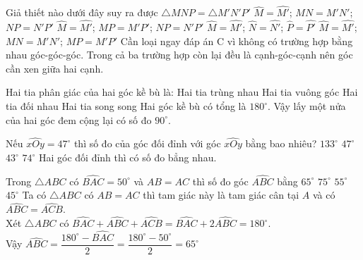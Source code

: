 			\begin{ex}%
				Giả thiết nào dưới đây suy ra được $\triangle MNP=\triangle M'N'P'$
				\choice
				{$\widehat{M}=\widehat{M'}$; $MN=M'N'$; $NP=N'P'$}
				{$\widehat{M}=\widehat{M'}$; $MP=M'P'$; $NP=N'P'$}
				{$\widehat{M}=\widehat{M'}$; $\widehat{N}=\widehat{N'}$; $\widehat{P}=\widehat{P'}$}
				{\True $\widehat{M}=\widehat{M'}$; $MN=M'N'$; $MP=M'P'$}
				\loigiai
				{
					Cần loại ngay đáp án C vì không có trường hợp bằng nhau góc-góc-góc. Trong cả ba trường hợp còn lại đều là cạnh-góc-cạnh nên góc cần xen giữa hai cạnh.
				}
			\end{ex}
			\begin{ex}%
				Hai tia phân giác của hai góc kề bù là:
				\choice
				{Hai tia trùng nhau}
				{\True Hai tia vuông góc}
				{Hai tia đối nhau}
				{Hai tia song song}
				\loigiai
				{
					Hai góc kề bù có tổng là $180^\circ$. Vậy lấy một nửa của hai góc đem cộng lại có số đo $90^\circ$.
				}
			\end{ex}
			\begin{ex}%
				Nếu $\widehat{xOy}=47^\circ$ thì số đo của góc đối đỉnh với góc $\widehat{xOy}$ bằng bao nhiêu?
				\choice
				{$133^\circ$}
				{\True $47^\circ$}
				{$43^\circ$}
				{$74^\circ$}
				\loigiai
				{
					Hai góc đối đỉnh thì có số đo bẳng nhau.
				}
			\end{ex}
			\begin{ex}%
				Trong $\triangle ABC$ có $\widehat{BAC}=50^\circ$ và $AB=AC$ thì số đo góc $\widehat{ABC}$ bằng
				\choice
				{\True $65^\circ$}
				{$75^\circ$}
				{$55^\circ$}
				{$45^\circ$}
				\loigiai
				{
					Ta có $\triangle ABC$ có $AB=AC$ thì tam giác này là tam giác cân tại $A$ và có $\widehat{ABC}=\widehat{ACB}$.\\
					Xét $\triangle ABC$ có $\widehat{BAC}+\widehat{ABC}+\widehat{ACB}=\widehat{BAC}+2\widehat{ABC}=180^\circ$.\\
					Vậy $\widehat{ABC}=\dfrac{180^\circ-\widehat{BAC}}{2}=\dfrac{180^\circ-50^\circ}{2}=65^\circ$
				}
			\end{ex}
	
